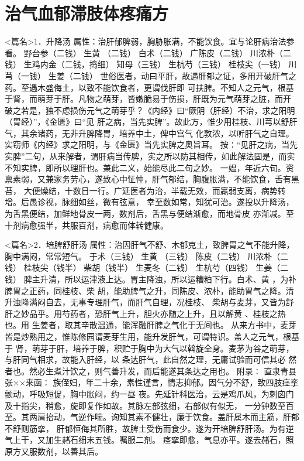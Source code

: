 \documentclass[a4paper,12pt,UTF8,twoside]{ctexbook}
\begin{document}
\chapter{治气血郁滞肢体疼痛方}
<篇名>1．升降汤
属性：治肝郁脾弱，胸胁胀满，不能饮食。宜与论肝病治法参看。 
野台参（二钱） 生黄 （二钱） 白术（二钱） 广陈皮（二钱） 川浓朴（二钱） 生鸡内金（二钱，捣细） 
知母（三钱） 生杭芍（三钱） 桂枝尖（一钱） 川芎（一钱） 生姜（二钱） 
世俗医者，动曰平肝，故遇肝郁之证，多用开破肝气之药。至遇木盛侮土，以致不能饮食者，更谓伐肝即 
可扶脾。不知人之元气，根基于肾，而萌芽于肝。凡物之萌芽，皆嫩脆易于伤损，肝既为元气萌芽之脏，而开 
破之若是，独不虑损伤元气之萌芽乎？《内经》曰“厥阴（肝经）不治，求之阳明（胃经）”，《金匮》曰“见 
肝之病，当先实脾”。故此方，惟少用桂枝、川芎以舒肝气，其余诸药，无非升脾降胃，培养中土，俾中宫气 
化敦浓，以听肝气之自理。实窃师《内经》求之阳明，与《金匮》当先实脾之奥旨耳。 
按∶“见肝之病，当先实脾”二句，从来解者，谓肝病当传脾，实之所以防其相传，如此解法固是，而实 
不知实脾，即所以理肝也。兼此二义，始能尽此二句之妙。 
一媪，年近六旬。资禀素弱，又兼家务劳心，遂致心中怔忡，肝气郁结，胸腹胀满，不能饮食，舌有黑苔， 
大便燥结，十数日一行。广延医者为治，半载无效，而羸弱支离，病势转增。后愚诊视，脉细如丝，微有弦意， 
幸至数如常，知犹可治。遂投以升降汤，为舌黑便结，加鲜地骨皮一两，数剂后，舌黑与便结渐愈，而地骨皮 
亦渐减。至十剂病愈强半，共服百剂，病愈而体转健康。 


<篇名>2．培脾舒肝汤
属性：治因肝气不舒、木郁克土，致脾胃之气不能升降，胸中满闷，常常短气。 
于术（三钱） 生黄 （三钱） 陈皮（二钱） 川浓朴（二钱） 桂枝尖（钱半） 柴胡（钱半） 
生麦冬（二钱） 生杭芍（四钱） 生姜（二钱） 
脾主升清，所以运津液上达。胃主降浊，所以运糟粕下行。白术、黄 ，为补脾胃之正药，同桂枝、柴 
胡，能助脾气之升，同陈皮、浓朴，能助胃气之降。清升浊降满闷自去，无事专理肝气，而肝气自理，况桂枝、 
柴胡与麦芽，又皆为舒肝之妙品乎。用芍药者，恐肝气上升，胆火亦随之上升，且以解黄 、桂枝之热也。用 
生姜者，取其辛散温通，能浑融肝脾之气化于无间也。 
从来方书中，麦芽皆是炒熟用之，惟陈修园谓麦芽生用，能升发肝气，可谓特识。盖人之元气，根基于 
肾，萌芽于肝，培养于脾，积贮于胸中为大气以斡旋全身。麦茅为谷之萌芽，与肝同气相求，故能入肝经，以 
条达肝气，此自然之理，无庸试验而可信其必 
然者也。然必生煮汁饮之，则气善升发，而后能遂其条达之用也。 
附录∶ 
直隶青县张××来函∶ 
族侄妇，年二十余，素性谨言，情志抑郁。因气分不舒，致四肢痉挛颤动，呼吸短促，胸中胀闷，约一昼 
夜。先延针科医治，云是鸡爪风，为刺囟门及十指尖，稍愈，旋即复作如故。其脉左部弦细，右部似有似无， 
一分钟数至百至。其两肩抬动，气逆作喘。询知其素不健壮，廉于饮食。盖肝属木而主筋，肝郁不舒则筋挛， 
肝郁恒侮其所胜，故脾土受伤而食少。遂为开培脾舒肝汤。为有逆气上干，又加生赭石细末五钱。嘱服二剂。 
痉挛即愈，气息亦平。遂去赭石，照原方又服数剂，以善其后。 
\end{document}
